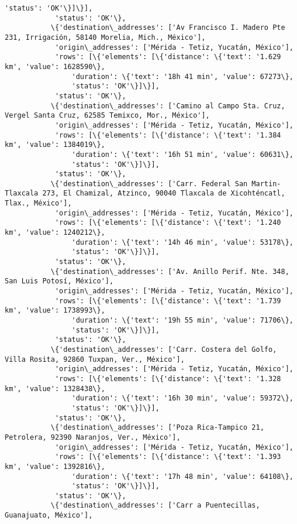 \documentclass[11pt]{article}
\begin{document}
\begin{Verbatim}[commandchars=\\\{\}]
                'status': 'OK'\}]\}],
            'status': 'OK'\},
           \{'destination\_addresses': ['Av Francisco I. Madero Pte 231, Irrigación, 58140 Morelia, Mich., México'],
            'origin\_addresses': ['Mérida - Tetiz, Yucatán, México'],
            'rows': [\{'elements': [\{'distance': \{'text': '1.629 km', 'value': 1628590\},
                'duration': \{'text': '18h 41 min', 'value': 67273\},
                'status': 'OK'\}]\}],
            'status': 'OK'\},
           \{'destination\_addresses': ['Camino al Campo Sta. Cruz, Vergel Santa Cruz, 62585 Temixco, Mor., México'],
            'origin\_addresses': ['Mérida - Tetiz, Yucatán, México'],
            'rows': [\{'elements': [\{'distance': \{'text': '1.384 km', 'value': 1384019\},
                'duration': \{'text': '16h 51 min', 'value': 60631\},
                'status': 'OK'\}]\}],
            'status': 'OK'\},
           \{'destination\_addresses': ['Carr. Federal San Martin-Tlaxcala 273, El Chamizal, Atzinco, 90040 Tlaxcala de Xicohténcatl, Tlax., México'],
            'origin\_addresses': ['Mérida - Tetiz, Yucatán, México'],
            'rows': [\{'elements': [\{'distance': \{'text': '1.240 km', 'value': 1240212\},
                'duration': \{'text': '14h 46 min', 'value': 53178\},
                'status': 'OK'\}]\}],
            'status': 'OK'\},
           \{'destination\_addresses': ['Av. Anillo Perif. Nte. 348, San Luis Potosí, México'],
            'origin\_addresses': ['Mérida - Tetiz, Yucatán, México'],
            'rows': [\{'elements': [\{'distance': \{'text': '1.739 km', 'value': 1738993\},
                'duration': \{'text': '19h 55 min', 'value': 71706\},
                'status': 'OK'\}]\}],
            'status': 'OK'\},
           \{'destination\_addresses': ['Carr. Costera del Golfo, Villa Rosita, 92860 Tuxpan, Ver., México'],
            'origin\_addresses': ['Mérida - Tetiz, Yucatán, México'],
            'rows': [\{'elements': [\{'distance': \{'text': '1.328 km', 'value': 1328438\},
                'duration': \{'text': '16h 30 min', 'value': 59372\},
                'status': 'OK'\}]\}],
            'status': 'OK'\},
           \{'destination\_addresses': ['Poza Rica-Tampico 21, Petrolera, 92390 Naranjos, Ver., México'],
            'origin\_addresses': ['Mérida - Tetiz, Yucatán, México'],
            'rows': [\{'elements': [\{'distance': \{'text': '1.393 km', 'value': 1392816\},
                'duration': \{'text': '17h 48 min', 'value': 64108\},
                'status': 'OK'\}]\}],
            'status': 'OK'\},
           \{'destination\_addresses': ['Carr a Puentecillas, Guanajuato, México'],

\end{Verbatim}
\end{document}
